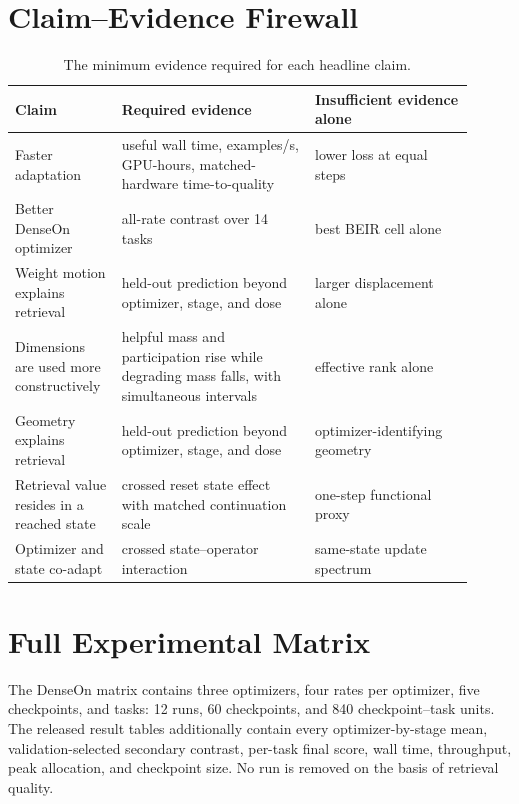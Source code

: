 \documentclass[11pt]{article}
\begin{document}
\section{Claim--Evidence Firewall}

\begin{table}[t]
\centering
\small
\begin{tabular}{p{0.20\linewidth}p{0.39\linewidth}p{0.32\linewidth}}
\toprule
Claim & Required evidence & Insufficient evidence alone \\
\midrule
Faster adaptation & useful wall time, examples/s, GPU-hours, matched-hardware time-to-quality & lower loss at equal steps \\
Better DenseOn optimizer & all-rate contrast over 14 tasks & best BEIR cell alone \\
Weight motion explains retrieval & held-out prediction beyond optimizer, stage, and dose & larger displacement alone \\
Dimensions are used more constructively & helpful mass and participation rise while degrading mass falls, with simultaneous intervals & effective rank alone \\
Geometry explains retrieval & held-out prediction beyond optimizer, stage, and dose & optimizer-identifying geometry \\
Retrieval value resides in a reached state & crossed reset state effect with matched continuation scale & one-step functional proxy \\
Optimizer and state co-adapt & crossed state--operator interaction & same-state update spectrum \\
\bottomrule
\end{tabular}
\caption{The minimum evidence required for each headline claim.}
\label{tab:claim-firewall}
\end{table}

\section{Full Experimental Matrix}

The DenseOn matrix contains three optimizers, four rates per optimizer, five
checkpoints, and \NumBEIRTasks{} tasks: 12 runs, 60 checkpoints, and 840 checkpoint--task units.
The released result tables additionally contain every optimizer-by-stage mean, validation-selected
secondary contrast, per-task final score, wall time, throughput, peak allocation, and checkpoint
size. No run is removed on the basis of retrieval quality.
\end{document}
